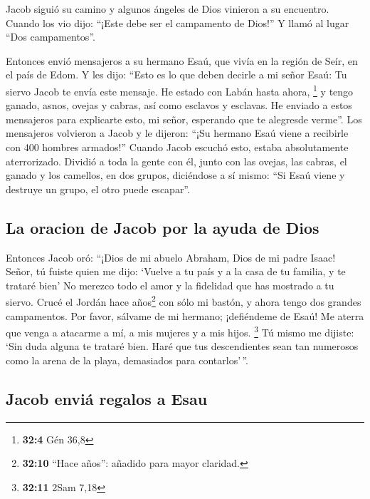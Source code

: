  Jacob siguió su camino y algunos ángeles de Dios vinieron
a su encuentro.  Cuando los vio dijo: ``¡Este debe ser el
campamento de Dios!'' Y llamó al lugar ``Dos campamentos''.

 Entonces envió mensajeros a su hermano Esaú, que vivía en
la región de Seír, en el país de Edom.  Y les dijo: ``Esto
es lo que deben decirle a mi señor Esaú: Tu siervo Jacob te envía este
mensaje. He estado con Labán hasta ahora, \footnote{\textbf{32:4} Gén
  36,8}  y tengo ganado, asnos, ovejas y cabras, así como
esclavos y esclavas. He enviado a estos mensajeros para explicarte esto,
mi señor, esperando que te alegresde verme''.  Los
mensajeros volvieron a Jacob y le dijeron: ``¡Su hermano Esaú viene a
recibirle con 400 hombres armados!''  Cuando Jacob escuchó
esto, estaba absolutamente aterrorizado. Dividió a toda la gente con él,
junto con las ovejas, las cabras, el ganado y los camellos, en dos
grupos,  diciéndose a sí mismo: ``Si Esaú viene y destruye
un grupo, el otro puede escapar''.

\hypertarget{la-oracion-de-jacob-por-la-ayuda-de-dios}{%
\subsection{La oracion de Jacob por la ayuda de
Dios}\label{la-oracion-de-jacob-por-la-ayuda-de-dios}}

 Entonces Jacob oró: ``¡Dios de mi abuelo Abraham, Dios de
mi padre Isaac! Señor, tú fuiste quien me dijo: `Vuelve a tu país y a la
casa de tu familia, y te trataré bien'  No merezco todo
el amor y la fidelidad que has mostrado a tu siervo. Crucé el Jordán
hace años\footnote{\textbf{32:10} ``Hace años'': añadido para mayor
  claridad.} con sólo mi bastón, y ahora tengo dos grandes campamentos.
 Por favor, sálvame de mi hermano; ¡defiéndeme de Esaú!
Me aterra que venga a atacarme a mí, a mis mujeres y a mis hijos.
\footnote{\textbf{32:11} 2Sam 7,18}  Tú mismo me dijiste:
`Sin duda alguna te trataré bien. Haré que tus descendientes sean tan
numerosos como la arena de la playa, demasiados para contarlos'\,''.

\hypertarget{jacob-enviuxe1-regalos-a-esau}{%
\subsection{Jacob enviá regalos a
Esau}\label{jacob-enviuxe1-regalos-a-esau}}

